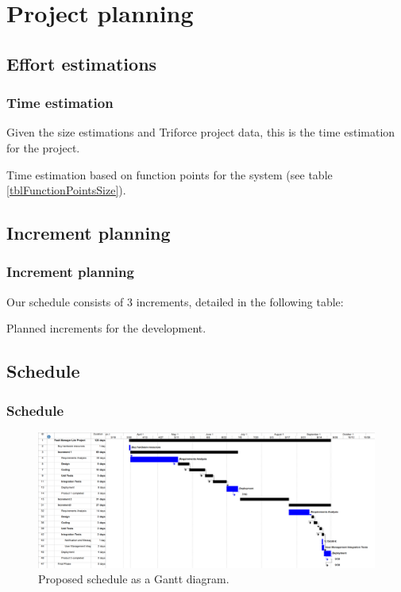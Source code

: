 \documentclass[10pt, compress,usetitleprogressbar,aspectratio=1610]{beamer}
\begin{document}
\section{Project planning}

\subsection{Effort estimations}
\begin{frame}
\frametitle{Time estimation}
Given the size estimations and Triforce project data, this is the time estimation for the project.

\begin{table}[hbtp]
\centering

\caption{Time estimation based on function points for the system (see table \ref{tblFunctionPointsSize}).}
\label{tblFunctionPointsTime}
\end{table}
\end{frame}

\subsection{Increment planning}
\begin{frame}
\frametitle{Increment planning}

Our schedule consists of 3 increments, detailed in the following table:

\begin{table}[hbtp]
\centering

\caption{Planned increments for the development.}
\label{tblIncrements}
\end{table}
\end{frame}

\subsection{Schedule}
\begin{frame}
\frametitle{Schedule}
\begin{figure}[hbtp]
\centering
\includegraphics[width=\textwidth]{../GanttDiagram.png}
\caption{Proposed schedule as a Gantt diagram.}
\label{figGantt}
\end{figure}
\end{frame}
\end{document}
